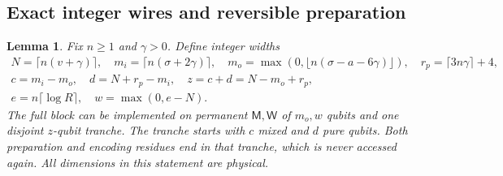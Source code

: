 \documentclass[11pt,a4paper]{article}
\numberwithin{equation}{section}
\theoremstyle{plain}
\newtheorem{lemma}[theorem]{Lemma}
\theoremstyle{definition}
\newcommand{\rg}[1]{\mathsf{#1}}
\begin{document}
\subsection{Exact integer wires and reversible preparation}
\label{app:integer-wires}

\begin{lemma}
\label{lem:integer-wires}
Fix $n\ge 1$ and $\gamma>0$. Define integer widths
\[
\begin{gathered}
N=\lceil n(v+\gamma)\rceil,\quad
m_i=\lceil n(\sigma+2\gamma)\rceil,\quad
m_o=\max(0,\lfloor n(\sigma-a-6\gamma)\rfloor),\quad
r_p=\lceil 3n\gamma\rceil+4,\\
c=m_i-m_o,\quad d=N+r_p-m_i,\quad z=c+d=N-m_o+r_p,\\
e=n\lceil\log R\rceil,\quad w=\max(0,e-N).
\end{gathered}
\]
The full block can be implemented on permanent $\rg{M},\rg{W}$ of $m_o,w$
qubits and one disjoint $z$-qubit tranche. The tranche starts with $c$ mixed
and $d$ pure qubits. Both preparation and encoding residues end in that
tranche, which is never accessed again. All dimensions in this statement are
physical.
\end{lemma}
\end{document}
